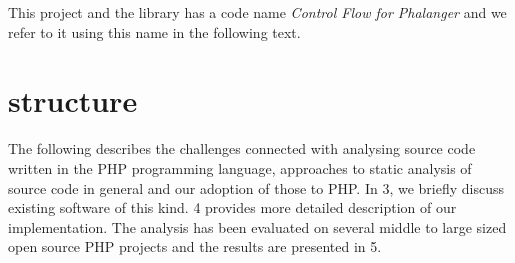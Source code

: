     This project and the library has a code name \emph{Control Flow for Phalanger} 
    and we refer to it using this name in the following text.
    
    \section{\wThesis{} structure}
    
    The following \wchapter{} describes the challenges connected with analysing source code 
    written in the PHP programming language, approaches to static analysis of 
    source code in general and our adoption of those to PHP. 
    In \wchapter{} 3, we briefly discuss existing software of 
    this kind. \wChapter{} 4 provides more detailed description of our implementation. 
    The analysis has been evaluated on several middle to large sized open source 
    PHP projects and the results are presented in \wchapter{} 5.
    
